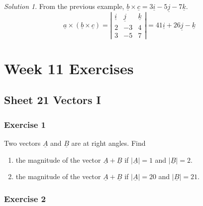 \documentclass[
  11pt,
  oneside]{book}
\providecommand{\tightlist}{%
  \setlength{\itemsep}{0pt}\setlength{\parskip}{0pt}}
\newcommand{\slide}{}
\theoremstyle{definition}
\theoremstyle{definition}
\theoremstyle{definition}
\theoremstyle{definition}
\theoremstyle{remark}
\newtheorem*{solution}{Solution}
\begin{document}
\begin{solution}
From the previous example, \(\underline b \times\underline c = 3\underline i-5\underline j-7\underline k\).
\[
\underline a \times (\underline b \times\underline c) = \left|\begin{array}{ccc}\underline i&\underline j&\underline k\\2&-3&4\\3&-5&7\end{array}\right| = 41\underline i+26\underline j-\underline k
\]
\end{solution}

\begin{slidesonly}

\slide

\hbox{}
\slide

\end{slidesonly}

\chapter*{Week 11 Exercises}\label{week-11-exercises}

\section{Sheet 21 Vectors I}\label{sheet-21-vectors-i}

\subsection*{Exercise 1}\label{exercise-1-12}

Two vectors \(\underline A\) and \(\underline B\) are at right angles. Find

\begin{enumerate}
\def\labelenumi{\roman{enumi}.}
\tightlist
\item
  the magnitude of the vector \(\underline A+\underline B\) if \(|\underline A| = 1\) and \(|\underline B| = 2\).
\item
  the magnitude of the vector \(\underline A+\underline B\) if \(|\underline A|=20\) and \(|\underline B| = 21\).
\end{enumerate}

\slide

\subsection*{Exercise 2}\label{exercise-2-12}
\end{document}
